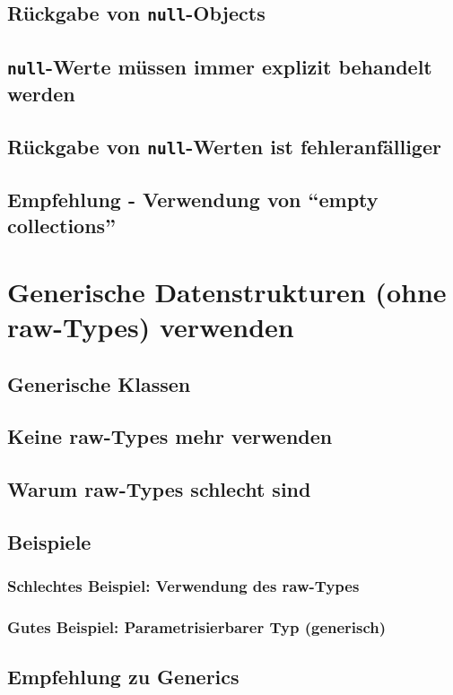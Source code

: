 \subsection{Rückgabe von \texttt{null}-Objects}
\subsection{\texttt{null}-Werte müssen immer explizit behandelt werden}
\subsection{Rückgabe von \texttt{null}-Werten ist fehleranfälliger}
\subsection{Empfehlung - Verwendung von "`empty collections"'}

\section{Generische Datenstrukturen (ohne raw-Types) verwenden}
\subsection{Generische Klassen}
\subsection{Keine raw-Types mehr verwenden}
\subsection{Warum raw-Types schlecht sind}
\subsection{Beispiele}
\subsubsection{Schlechtes Beispiel: Verwendung des raw-Types}
\subsubsection{Gutes Beispiel: Parametrisierbarer Typ (generisch)}
\subsection{Empfehlung zu Generics}

